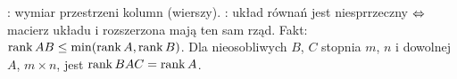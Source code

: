 :  wymiar przestrzeni kolumn (wierszy).
: układ równań jest niesprrzeczny $\Leftrightarrow$ macierz układu i rozszerzona mają ten sam rząd.
Fakt: $\operatorname{rank} AB \le \min (\operatorname{rank} A, \operatorname{rank} B)$.
Dla nieosobliwych $B$, $C$ stopnia $m$, $n$ i dowolnej $A$, $m \times n$, jest $\operatorname{rank} BAC = \operatorname{rank} A$.